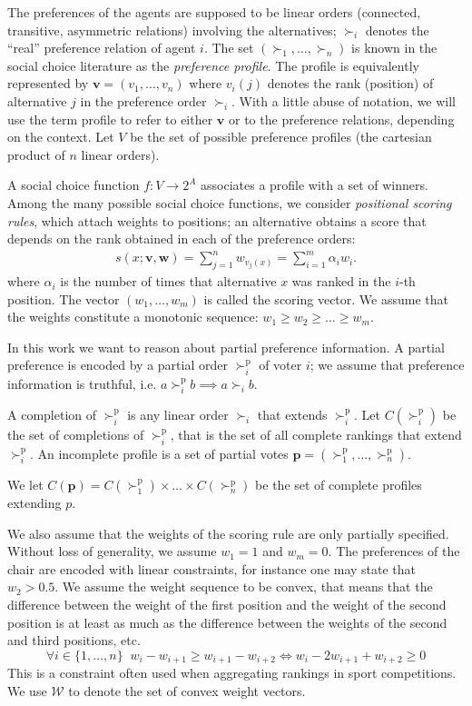 \documentclass[12pt]{article}
\newcommand{\pref}{\succ}%
\newcommand{\ppref}{\succ^\text{p}}%
\newcommand{\profile}{\textbf{v}}%
\newcommand{\w}{\textbf{w}}%
\begin{document}
The preferences of the agents are supposed to be linear orders (connected, transitive, asymmetric relations) involving the alternatives;
$\pref_i$ denotes the ``real'' preference relation of agent $i$. 
The set $(\pref_1,\ldots,\pref_n)$ is known in the social choice literature as the {\em preference  profile}.
The profile is equivalently represented by $\profile=(v_1,\ldots,v_n)$ where $v_i(j)$ denotes the rank (position) of alternative $j$ in the preference order $\pref_i$. 
With a little abuse of notation, we will use the term profile to refer to either $\profile$ or to the preference relations, depending on the context.
Let $V$ be the set of possible preference profiles (the cartesian product of $n$ linear orders).

A social choice function $f : V \rightarrow 2^A$ associates a profile with a set of winners.
Among the many possible social choice functions, we consider {\em positional scoring rules}, which attach weights to positions; an alternative obtains a score that depends on the rank obtained in each of the preference orders:
\begin{align}
s(x; \profile, \w) = \sum_{j=1}^{n} w_{v_j(x)}
= \sum_{i=1}^{m} \alpha_i w_i . \label{eq:srule}
\end{align}
where $\alpha_i$ is the number of times that alternative $x$ was ranked in the $i$-th position.
The vector $(w_1,\ldots,w_m)$ is called the scoring vector. We assume that the weights constitute a monotonic sequence: $w_{1} \geq w_{2} \geq \ldots \geq w_{m}$.

\medskip
In this work we want to reason about partial preference information.
A partial preference  is encoded by a partial order $\ppref_i$  of voter $i$;
we assume that preference information is truthful, i.e. $a \ppref_i b \implies a \pref_i b$.

A completion of $\ppref_i$ is any linear order $\pref_i$ that extends $\ppref_i$.
Let $C(\ppref_i)$ be the set of completions of $\ppref_i$, that is the set of all complete rankings that extend $\ppref_i$.
An incomplete profile is a set of partial votes %
$\textbf{p}=(\ppref_1,\ldots,\ppref_n)$.

We let $C(\textbf{p})=C(\ppref_1)\times \ldots \times C(\ppref_n)$ be the set of complete profiles extending $p$.

\medskip
We also assume that the weights of the scoring rule are only partially specified.
Without loss of generality, we assume $w_1=1$ and $w_m=0$.
The preferences of the chair are encoded with linear constraints, for instance one may state
that $w_2>0.5$.
We assume the weight sequence to be convex, that means that the difference between the weight of the first position and the weight of the second position is at least as much as the difference between the weights of the second and third positions, etc. 
\[ \forall i \in \{1,\ldots,n\} \;\; w_i - w_{i+1} \geq w_{i+1}-w_{i+2} \iff  w_i - 2 w_{i+1} + w_{i+2} \geq 0 \]
This is a constraint often used when aggregating rankings in sport competitions.
We use $\mathcal{W}$ to denote the set of convex weight vectors.
\end{document}
